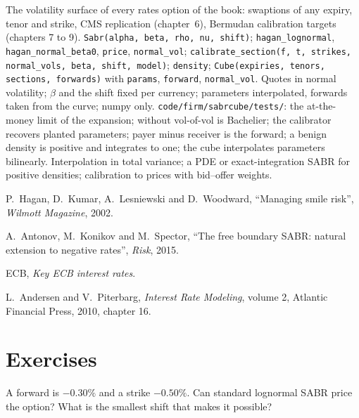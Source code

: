 \begin{build}
 The volatility surface of every rates option of the book:
swaptions of any expiry, tenor and strike, CMS replication (chapter~6),
Bermudan calibration targets (chapters 7 to 9).
 \texttt{Sabr(alpha, beta, rho, nu, shift)};
\texttt{hagan\_lognormal}, \texttt{hagan\_normal\_beta0}, \texttt{price},
\texttt{normal\_vol}; \texttt{calibrate\_section(f, t, strikes, normal\_vols,
beta, shift, model)}; \texttt{density}; \texttt{Cube(expiries, tenors, sections,
forwards)} with \texttt{params}, \texttt{forward}, \texttt{normal\_vol}.
 Quotes in normal volatility; $\beta$ and the shift fixed per
currency; parameters interpolated, forwards taken from the curve; numpy only.
 \texttt{code/firm/sabrcube/tests/}: the at-the-money
limit of the expansion;  without vol-of-vol is Bachelier; the
calibrator recovers planted parameters; payer minus receiver is the forward;
a benign density is positive and integrates to one; the cube interpolates
parameters bilinearly.
 Interpolation in total variance; a PDE or exact-integration
SABR for positive densities; calibration to prices with bid--offer weights.
\end{build}

\begin{omsources}
\item P.\ Hagan, D.\ Kumar, A.\ Lesniewski and D.\ Woodward, ``Managing smile
risk'', \emph{Wilmott Magazine}, 2002.
\item A.\ Antonov, M.\ Konikov and M.\ Spector, ``The free boundary SABR:
natural extension to negative rates'', \emph{Risk}, 2015.
\item ECB, \emph{Key ECB interest rates}.
\item L.\ Andersen and V.\ Piterbarg, \emph{Interest Rate Modeling}, volume 2,
Atlantic Financial Press, 2010, chapter 16.
\end{omsources}

\section{Exercises}

\begin{exercise}[$\star$]\label{exo:rc:sabr-in-rates-and-the-volatility-cube:1}
A forward is $-0.30\%$ and a strike $-0.50\%$. Can standard lognormal SABR price
the option? What is the smallest shift that makes it possible?
\end{exercise}

